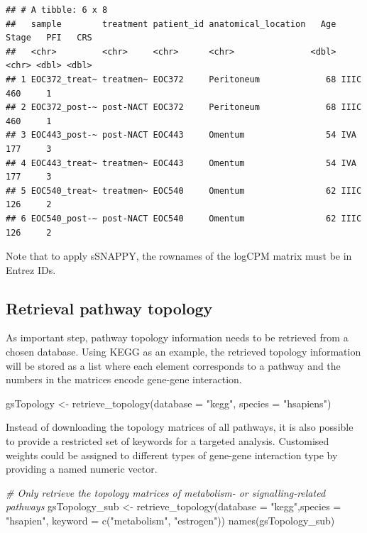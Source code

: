 \documentclass[9pt,a4paper,]{extarticle}
\newenvironment{Shaded}{\begin{snugshade}}{\end{snugshade}}
\newcommand{\AttributeTok}[1]{\textcolor[rgb]{0.77,0.63,0.00}{#1}}
\newcommand{\CommentTok}[1]{\textcolor[rgb]{0.56,0.35,0.01}{\textit{#1}}}
\newcommand{\FunctionTok}[1]{\textcolor[rgb]{0.00,0.00,0.00}{#1}}
\newcommand{\NormalTok}[1]{#1}
\newcommand{\OtherTok}[1]{\textcolor[rgb]{0.56,0.35,0.01}{#1}}
\newcommand{\StringTok}[1]{\textcolor[rgb]{0.31,0.60,0.02}{#1}}
\begin{document}
\begin{verbatim}
## # A tibble: 6 x 8
##   sample        treatment patient_id anatomical_location   Age Stage   PFI   CRS
##   <chr>         <chr>     <chr>      <chr>               <dbl> <chr> <dbl> <dbl>
## 1 EOC372_treat~ treatmen~ EOC372     Peritoneum             68 IIIC    460     1
## 2 EOC372_post-~ post-NACT EOC372     Peritoneum             68 IIIC    460     1
## 3 EOC443_post-~ post-NACT EOC443     Omentum                54 IVA     177     3
## 4 EOC443_treat~ treatmen~ EOC443     Omentum                54 IVA     177     3
## 5 EOC540_treat~ treatmen~ EOC540     Omentum                62 IIIC    126     2
## 6 EOC540_post-~ post-NACT EOC540     Omentum                62 IIIC    126     2
\end{verbatim}

Note that to apply sSNAPPY, the rownames of the logCPM matrix must be in Entrez IDs.

\hypertarget{retrieval-pathway-topology}{%
\subsection{Retrieval pathway topology}\label{retrieval-pathway-topology}}

As important step, pathway topology information needs to be retrieved from a chosen database.
Using KEGG as an example, the retrieved topology information will be stored as a list where each element corresponds to a pathway and the numbers in the matrices encode gene-gene interaction.

\begin{Shaded}
\begin{Highlighting}[]
\NormalTok{gsTopology }\OtherTok{\textless{}{-}} \FunctionTok{retrieve\_topology}\NormalTok{(}\AttributeTok{database =} \StringTok{"kegg"}\NormalTok{, }\AttributeTok{species =} \StringTok{"hsapiens"}\NormalTok{)}
\end{Highlighting}
\end{Shaded}

Instead of downloading the topology matrices of all pathways, it is also possible to provide a restricted set of keywords for a targeted analysis.
Customised weights could be assigned to different types of gene-gene interaction type by providing a named numeric vector.

\begin{Shaded}
\begin{Highlighting}[]
\CommentTok{\# Only retrieve the topology matrices of metabolism{-} or signalling{-}related pathways}
\NormalTok{gsTopology\_sub }\OtherTok{\textless{}{-}} \FunctionTok{retrieve\_topology}\NormalTok{(}\AttributeTok{database =} \StringTok{"kegg"}\NormalTok{,}\AttributeTok{species =} \StringTok{"hsapien"}\NormalTok{, }
                                    \AttributeTok{keyword =} \FunctionTok{c}\NormalTok{(}\StringTok{"metabolism"}\NormalTok{, }\StringTok{"estrogen"}\NormalTok{))}
\FunctionTok{names}\NormalTok{(gsTopology\_sub)}
\end{Highlighting}
\end{Shaded}
\end{document}
